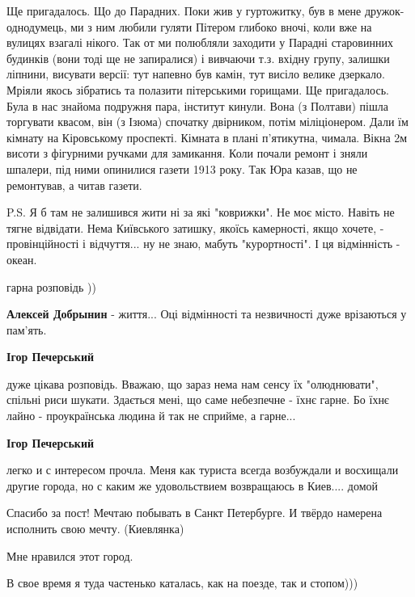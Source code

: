 \begin{itemize}
Ще пригадалось. Що до Парадних. Поки жив у гуртожитку, був в мене
дружок-однодумець, ми з ним любили гуляти Пітером глибоко вночі, коли вже на
вулицях взагалі нікого. Так от ми полюбляли заходити у Парадні старовинних
будинків (вони тоді ще не запиралися) і вивчаючи т.з. вхідну групу, залишки
ліпнини, висувати версії: тут напевно був камін, тут висіло велике дзеркало.
Мріяли якось зібратись та полазити пітерськими горищами. Ще пригадалось. Була в
нас знайома подружня пара, інститут кинули. Вона (з Полтави) пішла торгувати
квасом, він (з Ізюма) спочатку двірником, потім міліціонером. Дали їм кімнату
на Кіровському проспекті. Кімната в плані п'ятикутна, чимала. Вікна 2м висоти з
фігурними ручками для замикання. Коли почали ремонт і зняли шпалери, під ними
опинилися газети 1913 року. Так Юра казав, що не ремонтував, а читав газети.

P.S. Я б там не залишився жити ні за які "коврижки". Не моє місто. Навіть не
тягне відвідати. Нема Київського затишку, якоїсь камерності, якщо хочете, -
провінційності і відчуття... ну не знаю, мабуть "курортності". І ця відмінність
- океан.

\begin{itemize} %
гарна розповідь ))


\textbf{Алексей Добрынин} - життя... Оці відмінності та незвичності дуже врізаються у пам'ять.

\textbf{Ігор Печерський} 

дуже цікава розповідь. Вважаю, що зараз нема нам сенсу їх "олюднювати", спільні
риси шукати. Здається мені, що саме небезпечне - їхнє гарне. Бо їхнє лайно -
проукраїнська людина й так не сприйме, а гарне...

\textbf{Ігор Печерський} 

легко и с интересом прочла. Меня как туриста всегда возбуждали и восхищали
другие города, но с каким же удовольствием возвращаюсь в Киев.... домой

\end{itemize} %

Спасибо за пост! Мечтаю побывать в Санкт Петербурге. И твёрдо намерена исполнить свою мечту. (Киевлянка)


Мне нравился этот город.

В свое время я туда частенько каталась, как на поезде, так и стопом)))


\end{itemize}
